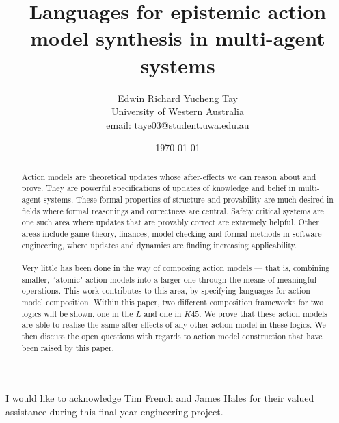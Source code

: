 \documentclass{cshonours}
\title{Languages for epistemic action model synthesis in multi-agent systems}
\author{Edwin Richard Yucheng Tay \\
University of Western Australia \\
email: taye03@student.uwa.edu.au }
\date{\today}
\numberwithin{equation}{chapter}
\newcommand{\lang}{\ensuremath{L}}
\newcommand{\langKFF}{\ensuremath{K45}}
\begin{document}
\maketitle

\begin{abstract}

Action models are theoretical updates whose after-effects we can reason about
and prove.
They are powerful specifications of updates of knowledge and belief in
multi-agent systems.
These formal properties of structure and provability are much-desired in
fields where formal reasonings and correctness are central.
Safety critical systems are one such area where updates that are provably
correct are extremely helpful.
Other areas include game theory, finances, model checking and formal methods in
software engineering, where updates and dynamics are finding increasing applicability.\\
\\
Very little has been done in the way of composing action models --- that is, combining smaller,
``atomic" action models into a larger one through the means of meaningful operations.
This work contributes to this area, by specifying languages for action model composition.
Within this paper, two different composition frameworks for two logics will be shown, one in
the $\lang$ and one in $\langKFF$.
We prove that these action models are able to realise the same after effects of
any other action model in these logics.
We then discuss the open questions with regards to action model construction
that have been raised by this paper.

\end{abstract}

\begin{acknowledgements}
I would like to acknowledge Tim French and James Hales for their valued assistance during this final
year engineering project.
\end{acknowledgements}

\pagebreak

\tableofcontents

\listoffigures








\appendix







\end{document}

